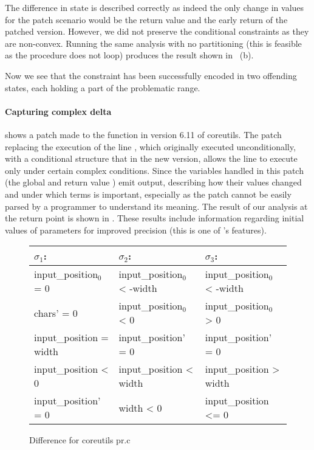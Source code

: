 The difference in state is described correctly as indeed the only change in values for the patch scenario would be the return value and the early return of the patched version. However, we did not preserve the conditional constraints as they are non-convex. Running the same analysis with no partitioning (this is feasible as the procedure does not loop) produces the result shown in ~(b).

Now we see that the  constraint has been successfully encoded in two offending states, each holding a part of the problematic range.

\paragraph{Capturing complex delta}



 shows a patch made to the  function in version 6.11 of coreutils. The patch replacing the execution of the line , which originally executed unconditionally, with a conditional structure that in the new version, allows the line to execute only under certain complex conditions. Since the variables handled in this patch (the global  and return value ) emit output, describing how their values changed and under which terms is important, especially as the patch cannot be easily parsed by a programmer to understand its meaning. The result of our analysis at the return point is shown in . These results include information regarding initial values of parameters for improved precision (this is one of {\tool}'s features).

\begin{figure}
\scriptsize
\centering
\begin{tabular}{l|l|l}
$\sigma_1$:                 & $\sigma_2$:                   & $\sigma_3$:
\\ \hline
input\_position${_0}$ = 0     & input\_position${_0}$  < -width & input\_position${_0}$  < -width
\\
chars' = 0                & input\_position${_0}$  < 0      & input\_position${_0}$  > 0
\\
input\_position = width   & input\_position' = 0        & input\_position' = 0
\\
input\_position < 0       & input\_position < width     & input\_position > width
\\
input\_position' = 0      & width < 0                   & input\_position <= 0
\\ \hline
\end{tabular}
\caption{Difference for coreutils pr.c }\label{Fi:CharToClump}
\end{figure}

